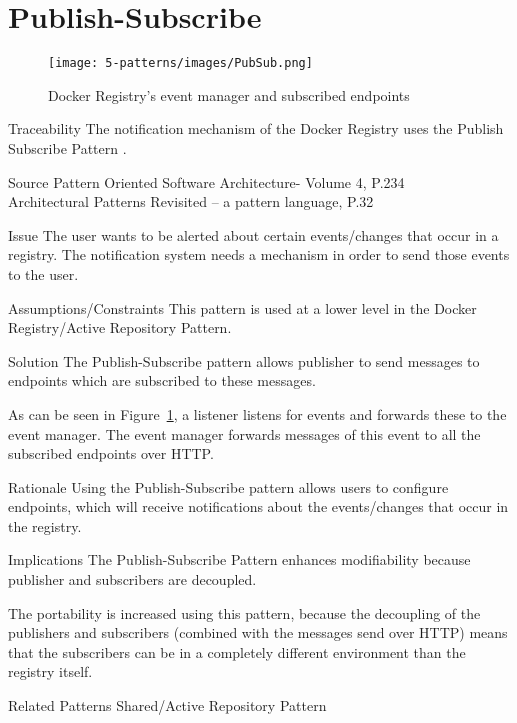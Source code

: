 \section{Publish-Subscribe}
\begin{figure}[H]
\centering
\texttt{[image: 5-patterns/images/PubSub.png]}
\caption{Docker Registry's event manager and subscribed endpoints}
\label{fig:publish-subscribe}
\end{figure}
\begin{patdescription}

\item[Traceability]
The notification mechanism of the Docker Registry uses the Publish Subscribe Pattern \cite{docknotif}.

\item[Source]
Pattern Oriented Software Architecture- Volume 4, P.234 \cite{wiley4} \\
Architectural Patterns Revisited -- a pattern language, P.32
\cite{avgeriou2005architectural}

\item[Issue] The user wants to be alerted about certain events/changes that occur in a registry.
The notification system needs a mechanism in order to send those events to the user.

\item[Assumptions/Constraints] 
This pattern is used at a lower level in the Docker Registry/Active Repository Pattern.

\item[Solution]
The Publish-Subscribe pattern allows publisher to send messages to endpoints which are subscribed to these messages.

As can be seen in Figure~\ref{fig:publish-subscribe}, a listener listens for events and forwards these to the event manager. The event manager forwards messages of this event to all the subscribed endpoints over HTTP.

\item[Rationale] 
Using the Publish-Subscribe pattern allows users to configure endpoints, which will receive notifications about the events/changes that occur in the registry.

\item[Implications] %
The Publish-Subscribe Pattern enhances modifiability because publisher and subscribers are decoupled.

The portability is increased using this pattern, because the decoupling of the publishers and subscribers (combined with the messages send over HTTP) means that the subscribers can be in a completely different environment than the registry itself.

\item [Related Patterns]
Shared/Active Repository Pattern


\end{patdescription}

